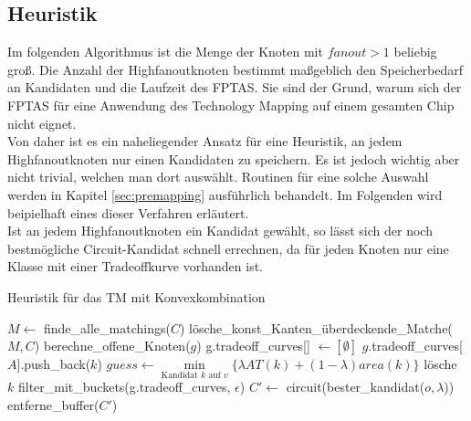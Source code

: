 \documentclass[11pt, a4paper, german]{article}
\newcommand{\TM}{Technology  Mapping }
\begin{document}
\subsection{Heuristik}
\label{subsec:heuristik}
Im folgenden Algorithmus ist die Menge der Knoten mit $fanout > 1$ beliebig groß.
Die Anzahl der Highfanoutknoten bestimmt maßgeblich den Speicherbedarf an Kandidaten und die Laufzeit des FPTAS. Sie sind der Grund, warum sich der FPTAS für eine Anwendung des \TM auf einem gesamten Chip nicht eignet. \\
Von daher ist es ein naheliegender Ansatz für eine Heuristik, an jedem Highfanoutknoten nur einen Kandidaten zu speichern. Es ist jedoch wichtig aber nicht trivial, welchen man dort auswählt. Routinen für eine solche Auswahl werden in Kapitel \ref{sec:premapping} ausführlich behandelt. Im Folgenden wird beipielhaft eines dieser Verfahren erläutert. \\
Ist an jedem Highfanoutknoten ein Kandidat gewählt, so lässt sich der noch bestmögliche Circuit-Kandidat schnell errechnen, da für jeden Knoten nur eine Klasse mit einer Tradeoffkurve vorhanden ist.\\

\LinesNumbered
\begin{algorithm}[H]
\DontPrintSemicolon
\caption{Heuristik f\"ur das TM mit Konvexkombination}

   $M \gets$ finde\_alle\_matchings($C$)\;
   lösche\_konst\_Kanten\_überdeckende\_Matche($M, C$)\;
        {
			berechne\_offene\_Knoten($g$)\;	 
        }
  {
    g.tradeoff\_curves[] $\gets [\emptyset]$\;
    {
      {
        {
        	 {
			$g$.tradeoff\_curves[$A$].push\_back($k$)\;      	 
        	 }  
        }
      }
    }
  {
    $guess \gets \min\limits_{\text{Kandidat }k\text{ auf }v}\{ \lambda AT(k) + (1-\lambda) area(k)  \}$\;
    {
      {
	l\"osche $k$\;
      }
    }
  }    
    filter\_mit\_buckets(g.tradeoff\_curves, $\epsilon$)\;    
  }
  $C' \gets $ circuit(bester\_kandidat($o, \lambda$))\;
  \Return entferne\_buffer($C'$)\;
\end{algorithm}\ \\
\end{document}
